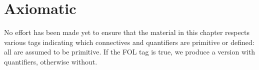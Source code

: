 \documentclass[../../../include/open-logic-chapter]{subfiles}
\begin{document}
\chapter{Axiomatic }

\begin{editorial}
  No effort has been made yet to ensure that the material in this
  chapter respects various tags indicating which connectives and
  quantifiers are primitive or defined: all are assumed to be
  primitive. If the FOL tag is true, we produce a version with
  quantifiers, otherwise without.
\end{editorial}














\OLEndChapterHook
\end{document}
